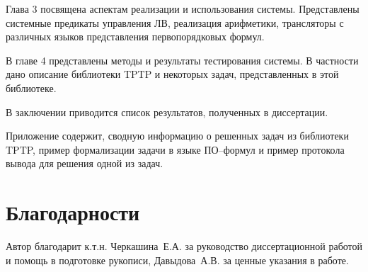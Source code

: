 Глава 3 посвящена аспектам реализации и использования системы. Представлены системные предикаты управления ЛВ, реализация арифметики, трансляторы с различных языков представления первопорядковых формул.

В главе 4 представлены методы и результаты тестирования системы. В частности дано описание библиотеки TPTP и некоторых задач, представленных в этой библиотеке. %

В заключении приводится список результатов, полученных в диссертации. %

Приложение содержит, сводную информацию о решенных задач из библиотеки TPTP, пример формализации задачи в языке ПО--формул и пример протокола вывода для решения одной из задач.



\section*{Благодарности} 
Автор благодарит к.т.н. Черкашина~Е.А. за руководство диссертационной работой и помощь в подготовке рукописи, Давыдова~А.В. за ценные указания в работе.


